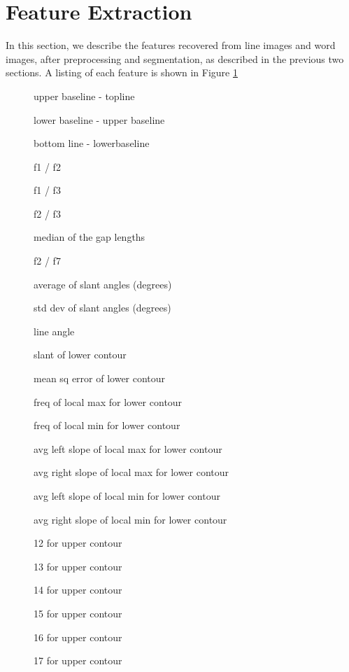 \documentclass[paper=a4, fontsize=11pt]{scrartcl} %
\numberwithin{equation}{section} %
\numberwithin{figure}{section} %
\numberwithin{table}{section} %
\begin{document}
\section{Feature Extraction}
\label{sec:feature}
In this section, we describe the features recovered from line images
and word images, after preprocessing and segmentation, as described in
the previous two sections. A listing of each feature is shown in Figure \ref{fig:featureList}

\begin{figure}
\label{fig:featureList}
\begin{multicols}{3}
\begin{enumerate*}
\item upper baseline - topline 				
\item lower baseline - upper baseline 			
\item bottom line - lowerbaseline 			
\item f1 / f2 							
\item f1 / f3 							
\item f2 / f3 							
\item median of the gap lengths 				
\item f2 / f7 							
\item average of slant angles (degrees) 			
\item std dev of slant angles (degrees) 			
\item line angle 						
\item slant of lower contour				
\item mean sq error of lower contour			
\item freq of local max for lower contour			
\item freq of local min for lower contour			
\item avg left slope of local max for lower contour	
\item avg right slope of local max  for lower contour	
\item avg left slope of local min for lower contour	
\item avg right slope of local min for lower contour  	
\item 12 for upper contour					
\item 13 for upper contour					
\item 14 for upper contour					
\item 15 for upper contour					
\item 16 for upper contour					
\item 17 for upper contour					

\end{enumerate*}
\end{multicols}
\end{figure}
\end{document}
